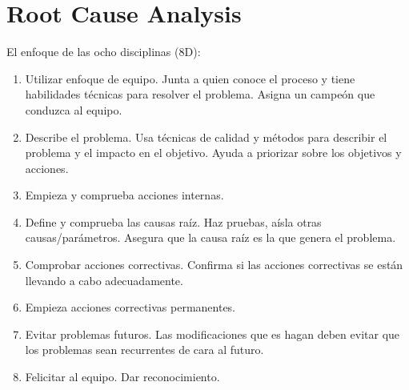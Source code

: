 \documentclass[]{article}
\begin{document}
\section{Root Cause Analysis}

El enfoque de las ocho disciplinas (8D): \begin{enumerate}
	\item Utilizar enfoque de equipo. Junta a quien conoce el proceso y tiene habilidades técnicas para resolver el problema. Asigna un campeón que conduzca al equipo.
	\item Describe el problema. Usa técnicas de calidad y métodos para describir el problema y el impacto en el objetivo. Ayuda a priorizar sobre los objetivos y acciones.
	\item Empieza y comprueba acciones internas. 
	\item Define y comprueba las causas raíz. Haz pruebas, aísla otras causas/parámetros. Asegura que la causa raíz es la que genera el problema.
	\item Comprobar acciones correctivas. Confirma si las acciones correctivas se están llevando a cabo adecuadamente.
	\item Empieza acciones correctivas permanentes. 
	\item Evitar problemas futuros. Las modificaciones que es hagan deben evitar que los problemas sean recurrentes de cara al futuro.
	\item Felicitar al equipo. Dar reconocimiento.
\end{enumerate}
\end{document}

